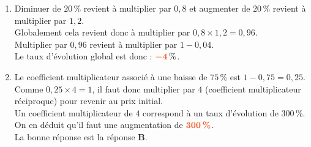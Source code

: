 \documentclass[a4paper,11pt]{article}
\begin{document}
\begin{seance}{} %
\begin{enumerate}
 \item Diminuer de $20\,\%$ revient à multiplier par $0{,}8$ et augmenter de $20\,\%$ revient à multiplier par $1{,}2$.\\
  Globalement cela revient donc à multiplier par $0{,}8\times 1{,}2=0{,}96$.\\
  Multiplier par $0{,}96$ revient à multiplier par  $1-0{,}04$. \\
          Le taux d'évolution global est donc : ${\color[HTML]{f15929}\boldsymbol{-4\,}} \%$.


\item Le coefficient multiplicateur associé à une baisse de $75\,\%$ est $1-0{,}75=0{,}25$.\\
    Comme $0{,}25\times 4=1$, il faut donc multiplier par $4$ (coefficient multiplicateur réciproque) pour revenir au prix initial.\\
      Un coefficient multiplicateur de $4$ correspond à un taux d'évolution de $300\,\%$.\\
      On en déduit qu'il faut une augmentation de ${\color[HTML]{f15929}\boldsymbol{300\,\%}}$.\\La bonne réponse est la réponse {\bfseries \color[HTML]{f15929}B}.



\end{enumerate}
\end{seance}
\end{document}
